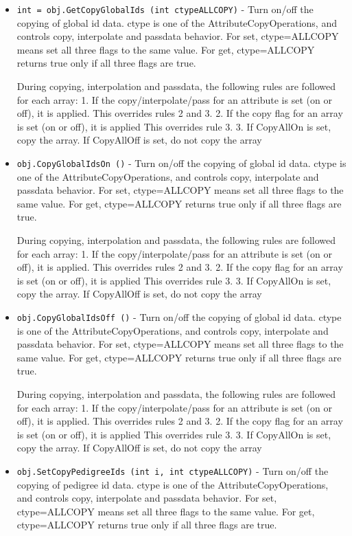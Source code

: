 \begin{itemize}
\item  \verb|int = obj.GetCopyGlobalIds (int ctypeALLCOPY)| -  Turn on/off the copying of global id data.
 ctype is one of the AttributeCopyOperations, and controls copy, 
 interpolate and passdata behavior.
 For set, ctype=ALLCOPY means set all three flags to the same value.
 For get, ctype=ALLCOPY returns true only if all three flags are true.

 During copying, interpolation and passdata, the following rules are 
 followed for each array:
 1. If the copy/interpolate/pass for an attribute is set (on or off), it is applied.
    This overrides rules 2 and 3.
 2. If the copy flag for an array is set (on or off), it is applied
    This overrides rule 3.
 3. If CopyAllOn is set, copy the array.
    If CopyAllOff is set, do not copy the array

\item  \verb|obj.CopyGlobalIdsOn ()| -  Turn on/off the copying of global id data.
 ctype is one of the AttributeCopyOperations, and controls copy, 
 interpolate and passdata behavior.
 For set, ctype=ALLCOPY means set all three flags to the same value.
 For get, ctype=ALLCOPY returns true only if all three flags are true.

 During copying, interpolation and passdata, the following rules are 
 followed for each array:
 1. If the copy/interpolate/pass for an attribute is set (on or off), it is applied.
    This overrides rules 2 and 3.
 2. If the copy flag for an array is set (on or off), it is applied
    This overrides rule 3.
 3. If CopyAllOn is set, copy the array.
    If CopyAllOff is set, do not copy the array

\item  \verb|obj.CopyGlobalIdsOff ()| -  Turn on/off the copying of global id data.
 ctype is one of the AttributeCopyOperations, and controls copy, 
 interpolate and passdata behavior.
 For set, ctype=ALLCOPY means set all three flags to the same value.
 For get, ctype=ALLCOPY returns true only if all three flags are true.

 During copying, interpolation and passdata, the following rules are 
 followed for each array:
 1. If the copy/interpolate/pass for an attribute is set (on or off), it is applied.
    This overrides rules 2 and 3.
 2. If the copy flag for an array is set (on or off), it is applied
    This overrides rule 3.
 3. If CopyAllOn is set, copy the array.
    If CopyAllOff is set, do not copy the array

\item  \verb|obj.SetCopyPedigreeIds (int i, int ctypeALLCOPY)| -  Turn on/off the copying of pedigree id data.
 ctype is one of the AttributeCopyOperations, and controls copy, 
 interpolate and passdata behavior.
 For set, ctype=ALLCOPY means set all three flags to the same value.
 For get, ctype=ALLCOPY returns true only if all three flags are true.


\end{itemize}

